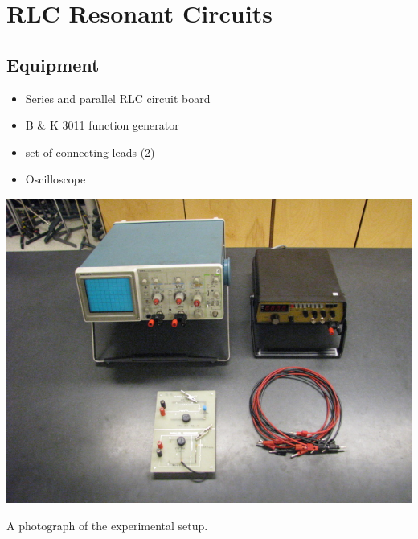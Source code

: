 





\chapter{RLC Resonant Circuits}

\section{Equipment}

\begin{minipage}[t]{0.6\textwidth}
\begin{itemize}[noitemsep]
\item Series and parallel RLC circuit board
\item B \& K 3011 function generator
\item set of connecting leads (2)
\end{itemize}
\end{minipage}
\begin{minipage}[t]{0.35\textwidth}
\begin{itemize}[noitemsep]
\item Oscilloscope
\end{itemize}
\end{minipage}

\begin{marginfigure}[+1in]
\includegraphics{RLC-Resonant-Circuits-Setup.jpg}
\caption{A photograph of the experimental setup.}
\label{fig:RLsetup}
\end{marginfigure}

